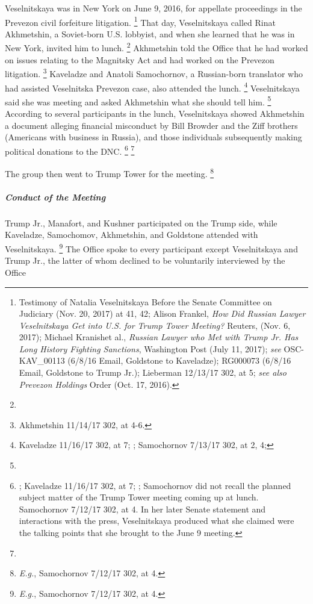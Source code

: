 Veselnitskaya was in New York on June 9, 2016, for appellate proceedings in the Prevezon civil forfeiture litigation.%
\footnote{Testimony of Natalia Veselnitskaya Before the Senate Committee on Judiciary (Nov. 20, 2017) at 41, 42;
Alison Frankel, \textit{How Did Russian Lawyer Veselnitskaya Get into U.S. for Trump Tower Meeting?} Reuters, (Nov. 6, 2017);
Michael Kranishet al., \textit{Russian Lawyer who Met with Trump Jr. Has Long History Fighting Sanctions}, Washington Post (July 11, 2017);
\textit{see} OSC-KAV\_00113 (6/8/16 Email, Goldstone to Kaveladze);
RG000073 (6/8/16 Email, Goldstone to Trump Jr.);
Lieberman 12/13/17 302, at 5;
\textit{see also Prevezon Holdings} Order (Oct. 17, 2016).}
That day, Veselnitskaya called Rinat Akhmetshin, a Soviet-born U.S. lobbyist,
and when she learned that he was in New York, invited him to lunch.%
\footnote{}
Akhmetshin told the Office that he had worked on issues relating to the Magnitsky Act and had worked on the Prevezon litigation.%
\footnote{Akhmetshin 11/14/17 302, at 4-6. }
Kaveladze and Anatoli Samochornov, a Russian-born translator who had assisted Veselnitska Prevezon case, also attended the lunch.%
\footnote{Kaveladze 11/16/17 302, at 7;
;
Samochornov 7/13/17 302, at 2, 4;
}
 Veselnitskaya said she was meeting  and asked Akhmetshin what she should tell him.%
\footnote{}
According to several participants in the lunch, Veselnitskaya showed Akhmetshin a document alleging financial misconduct by Bill Browder and the Ziff brothers (Americans with business in Russia), and those individuals subsequently making political donations to the DNC.%
\footnote{;
Kaveladze 11/16/17 302, at 7;
;
Samochornov did not recall the planned subject matter of the Trump Tower meeting coming up at lunch.
 Samochornov 7/12/17 302, at 4.
In her later Senate statement and interactions with the press, Veselnitskaya produced what she claimed were the talking points that she brought to the June 9 meeting.}
\footnote{}

The group then went to Trump Tower for the meeting.%
\footnote{\textit{E.g.}, Samochornov 7/12/17 302, at 4.}

\subparagraph{Conduct of the Meeting}

Trump Jr., Manafort, and Kushner participated on the Trump side, while Kaveladze, Samochomov, Akhmetshin, and Goldstone attended with Veselnitskaya.%
\footnote{\textit{E.g.}, Samochornov 7/12/17 302, at 4.}
The Office spoke to every participant except Veselnitskaya and Trump Jr., the latter of whom declined to be voluntarily interviewed by the Office

